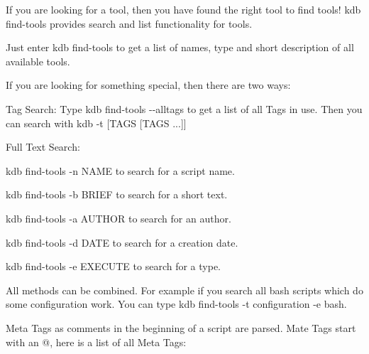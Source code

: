 
\begin{DoxyCode}{0}
\DoxyCodeLine{               [-t TAGS [TAGS ...]] [-b BRIEF] [-e EXECUTE]}
\end{DoxyCode}


If you are looking for a tool, then you have found the right tool to find tools! {\ttfamily kdb find-\/tools} provides search and list functionality for tools.

Just enter {\ttfamily kdb find-\/tools} to get a list of names, type and short description of all available tools.

If you are looking for something special, then there are two ways\+:


\begin{DoxyEnumerate}
\item Tag Search\+: Type {\ttfamily kdb find-\/tools -\/-\/alltags} to get a list of all Tags in use. Then you can search with {\ttfamily kdb -\/t \mbox{[}T\+A\+GS \mbox{[}T\+A\+GS ...\mbox{]}\mbox{]}}
\item Full Text Search\+:
\begin{DoxyItemize}
\item {\ttfamily kdb find-\/tools -\/n N\+A\+ME} to search for a script name.
\item {\ttfamily kdb find-\/tools -\/b B\+R\+I\+EF} to search for a short text.
\item {\ttfamily kdb find-\/tools -\/a A\+U\+T\+H\+OR} to search for an author.
\item {\ttfamily kdb find-\/tools -\/d D\+A\+TE} to search for a creation date.
\item {\ttfamily kdb find-\/tools -\/e E\+X\+E\+C\+U\+TE} to search for a type.
\end{DoxyItemize}
\end{DoxyEnumerate}

All methods can be combined. For example if you search all bash scripts which do some configuration work. You can type {\ttfamily kdb find-\/tools -\/t configuration -\/e bash}.

Meta Tags as comments in the beginning of a script are parsed. Mate Tags start with an {\ttfamily @}, here is a list of all Meta Tags\+:

